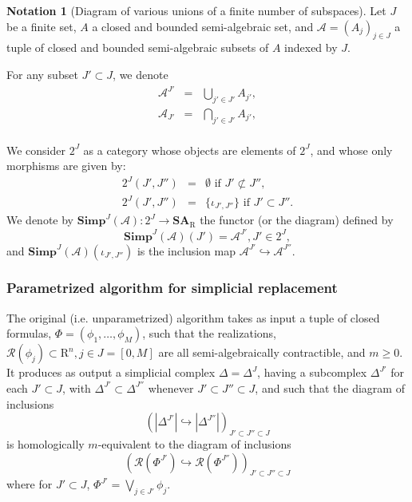 \documentclass{amsart}[10pts]
\theoremstyle{definition}
\newtheorem{notation}{Notation}[section]
\theoremstyle{remark}
\theoremstyle{observation}
\numberwithin{equation}{section}
\newcommand {\R} {\mathrm{R}}
\newcommand {\RR} {{\mathcal R}}
\newcommand{\Simp}{\mathbf{Simp}}
\newcommand{\SAcat}{\mathbf{SA}}
\begin{document}
\begin{notation} [Diagram of various unions of a finite number of subspaces]
\label{not:diagram-Delta}
Let $J$ be a finite set, $A$ a closed and bounded semi-algebraic set, 
and $\mathcal{A} = (A_j)_{j \in J}$ a tuple of closed and bounded semi-algebraic subsets of $A$  indexed by $J$.

For any subset 
$J' \subset J$,
we denote 
\begin{eqnarray*}
\mathcal{A}^{J'} &=& \bigcup_{j' \in J'} A_{j'}, \\
\mathcal{A}_{J'} &=& \bigcap_{j' \in J'} A_{j'}, \\
\end{eqnarray*}

We consider $2^J$ as a category whose objects are elements of $2^J$, and whose only morphisms 
are given by: 
\begin{eqnarray*}
2^J(J',J'') &=& \emptyset  \mbox{ if  } J' \not\subset J'', \\
2^J(J',J'') &=& \{\iota_{J',J''}\} \mbox{  if } J' \subset J''.
\end{eqnarray*} 
We denote by $\Simp^J(\mathcal{A}):2^J \rightarrow \SAcat_\R$ the functor (or the diagram) defined by
\[
\Simp^J(\mathcal{A})(J') = \mathcal{A}^{J'}, J' \in 2^J,
\]
and
$\Simp^J(\mathcal{A})(\iota_{J',J''})$ is the inclusion map $\mathcal{A}^{J'} \hookrightarrow \mathcal{A}^{J''}$.
\end{notation}




\subsubsection{Parametrized algorithm for simplicial replacement}
The original  (i.e. unparametrized) algorithm takes as input a tuple
of closed formulas, $\Phi = (\phi_1,\ldots,\phi_M)$, such that the
realizations, $\RR(\phi_j) \subset \R^n, j \in J = [0,M]$ are all semi-algebraically contractible, and $m \geq 0$. It produces as output 
a simplicial complex $\Delta = \Delta^J$, having a subcomplex $\Delta^{J'}$ for each $J' \subset J$, with $\Delta^{J'} \subset \Delta^{J''}$ whenever
$J' \subset J'' \subset J$, and such that the diagram of inclusions
\[
(|\Delta^{J'}| \hookrightarrow |\Delta^{J''}|)_{J' \subset J'' \subset J}
\]
is homologically $m$-equivalent to the diagram of inclusions
\[
(\RR(\Phi^{J'}) \hookrightarrow \RR(\Phi^{J''}))_{J' \subset J'' \subset J}
\]
where for $J ' \subset J$, $\Phi^{J'} = \bigvee_{j \in J'} \phi_j$.
\end{document}
